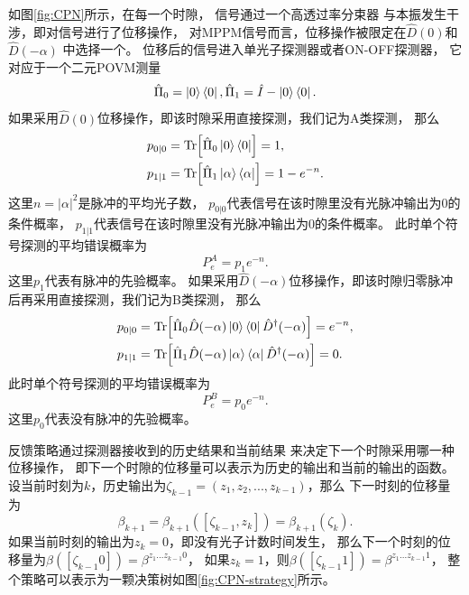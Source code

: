 如图\ref{fig:CPN}所示，在每一个时隙，
信号通过一个高透过率分束器
与本振发生干涉，即对信号进行了位移操作，
对MPPM信号而言，位移操作被限定在$\hat{D}(0)$和$\hat{D}(-\alpha)$
中选择一个。
位移后的信号进入单光子探测器或者ON-OFF探测器，
它对应于一个二元POVM测量
\begin{equation}
\hat{\Pi}_0 = \ket{0}\bra{0}, \hat{\Pi}_1 = \hat{I} - \ket{0}\bra{0}.
\end{equation}
如果采用$\hat{D}(0)$位移操作，即该时隙采用直接探测，我们记为A类探测，
那么
\begin{equation}
\begin{split}
p_{0|0} &= \Tr[\hat{\Pi}_0 \ket{0}\bra{0}] = 1,\\
p_{1|1} &= \Tr[\hat{\Pi}_1 \ket{\alpha}\bra{\alpha}] = 1-e^{-n}.
\end{split}
\label{eq:CPN-cond-1}
\end{equation}
这里$n=|\alpha|^2$是脉冲的平均光子数，
$p_{0|0}$代表信号在该时隙里没有光脉冲输出为0的条件概率，
$p_{1|1}$代表信号在该时隙里没有光脉冲输出为0的条件概率。
此时单个符号探测的平均错误概率为
\begin{equation}
P_e^{A} = p_1 e^{-n}.
\label{eq:DD-A-error}
\end{equation}
这里$p_1$代表有脉冲的先验概率。
如果采用$\hat{D}(-\alpha)$位移操作，即该时隙归零脉冲后再采用直接探测，我们记为B类探测，
那么
\begin{equation}
\begin{split}
p_{0|0} &= \Tr[\hat{\Pi}_0 \hat{D}(-\alpha)\ket{0}\bra{0}\hat{D}^\dagger(-\alpha)] = e^{-n},\\
p_{1|1} &= \Tr[\hat{\Pi}_1 \hat{D}(-\alpha)\ket{\alpha}\bra{\alpha}\hat{D}^\dagger(-\alpha)] = 0.
\end{split}
\label{eq:CPN-cond-2}
\end{equation}
此时单个符号探测的平均错误概率为
\begin{equation}
P_e^{B} = p_0 e^{-n}.
\label{eq:DD-B-error}
\end{equation}
这里$p_0$代表没有脉冲的先验概率。



反馈策略通过探测器接收到的历史结果和当前结果
来决定下一个时隙采用哪一种位移操作，
即下一个时隙的位移量可以表示为历史的输出和当前的输出的函数。
设当前时刻为$k$，历史输出为$\zeta_{k-1}=(z_1,z_2,...,z_{k-1})$，那么
下一时刻的位移量为
\begin{equation}
\beta_{k+1} = \beta_{k+1}([\zeta_{k-1} , z_k]) = \beta_{k+1}(\zeta_k).
\end{equation}
如果当前时刻的输出为$z_k=0$，即没有光子计数时间发生，
那么下一个时刻的位移量为$\beta([\zeta_{k-1} 0]) = \beta^{z_1...z_{k-1}0}$，
如果$z_k=1$，则$\beta([\zeta_{k-1} 1]) = \beta^{z_1...z_{k-1}1}$，
整个策略可以表示为一颗决策树如图\ref{fig:CPN-strategy}所示。



